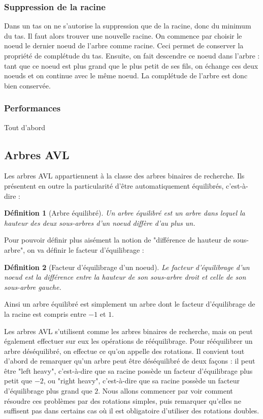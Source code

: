 \documentclass{article}
\newtheorem*{ddef}{Définition}
\begin{document}
\subsubsection{Suppression de la racine}
Dans un tas on ne s'autorise la suppression que de la racine, donc du minimum du tas. Il faut alors trouver une nouvelle racine. On commence par choisir le noeud le 
dernier noeud de l'arbre comme racine. Ceci permet de conserver la propriété de complétude du tas. Ensuite, on fait descendre ce noeud dans l'arbre : tant que ce noeud
est plus grand que le plus petit de ses fils, on échange ces deux noeuds et on continue avec le même noeud. La complétude de l'arbre est donc bien conservée.

\subsubsection{Performances}
Tout d'abord


\subsection{Arbres AVL}
Les arbres AVL appartiennent à la classe des arbres binaires de recherche. Ils présentent en outre la particularité d'être automatiquement équilibrés, c'est-à-dire :

\begin{ddef}[Arbre équilibré]
Un arbre équilibré est un arbre dans lequel la hauteur des deux sous-arbres d'un noeud diffère d'au plus un.
\end{ddef}

Pour pouvoir définir plus aisément la notion de "différence de hauteur de sous-arbre", on va définir le facteur d'équilibrage :

\begin{ddef}[Facteur d'équilibrage d'un noeud]
Le facteur d'équilibrage d'un noeud est la différence entre la hauteur de son sous-arbre droit et celle de son sous-arbre gauche.
\end{ddef}

Ainsi un arbre équilibré est simplement un arbre dont le facteur d'équilibrage de la racine est compris entre $-1$ et $1$.

Les arbres AVL s'utilisent comme les arbres binaires de recherche, mais on peut également effectuer sur eux les opérations de rééquilibrage. Pour rééquilibrer un arbre déséquilibré, on effectue ce qu'on appelle des rotations. Il convient tout d'abord de remarquer qu'un arbre peut être déséquilibré de deux façons : il peut être "left heavy", c'est-à-dire que sa racine possède un facteur d'équilibrage plus petit que $-2$, ou "right heavy", c'est-à-dire que sa racine possède un facteur d'équilibrage plus grand que $2$. Nous allons commencer par voir comment résoudre ces problèmes par des rotations simples, puis remarquer qu'elles ne suffisent pas dans certains cas où il est obligatoire d'utiliser des rotations doubles.
\end{document}
